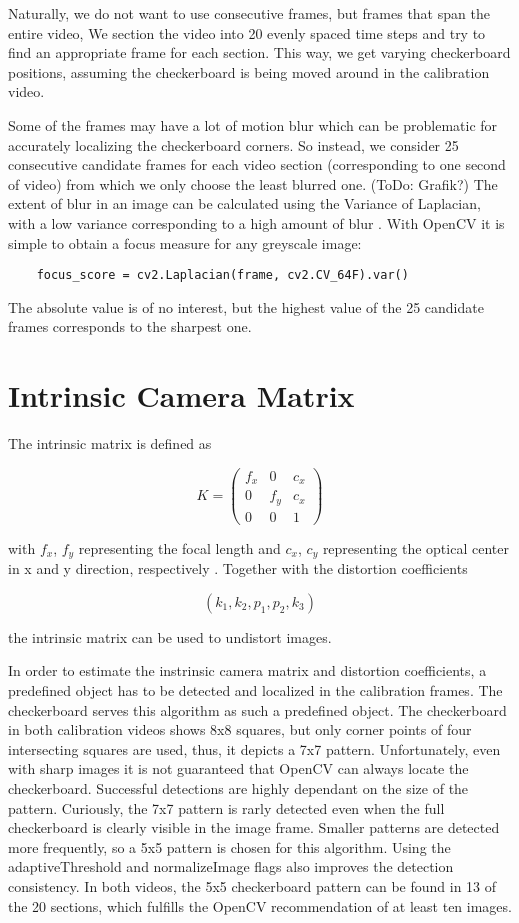 \documentclass[bibliography=totoc]{scrartcl}
\begin{document}
Naturally, we do not want to use consecutive frames, but frames that span the entire video,  
We section the video into 20 evenly spaced time steps and try to find an appropriate frame for each section.
This way, we get varying checkerboard positions, assuming the checkerboard is being moved around in the calibration video.

Some of the frames may have a lot of motion blur which can be problematic for accurately localizing the checkerboard corners.
So instead, we consider 25 consecutive candidate frames for each video section (corresponding to one second of video) from which we only choose the least blurred one. (ToDo: Grafik?)
The extent of blur in an image can be calculated using the Variance of Laplacian, with a low variance corresponding to a high amount of blur \cite{BlurDetection}.
With OpenCV it is simple to obtain a focus measure for any greyscale image:

\begin{lstlisting}
    focus_score = cv2.Laplacian(frame, cv2.CV_64F).var()
\end{lstlisting}

The absolute value is of no interest, but the highest value of the 25 candidate frames corresponds to the sharpest one.


\section{Intrinsic Camera Matrix}
The intrinsic matrix is defined as

$$
K =
\begin{pmatrix}
    f_x & 0 & c_x \\
    0 & f_y & c_x \\
    0 & 0 & 1
\end{pmatrix}
$$

with $f_x$, $f_y$ representing the focal length and $c_x$, $c_y$ representing the optical center in x and y direction, respectively \cite{CameraCalibration}.
Together with the distortion coefficients 

$$(k_1, k_2, p_1, p_2, k_3)$$

the intrinsic matrix can be used to undistort images.

In order to estimate the instrinsic camera matrix and distortion coefficients, a predefined object has to be detected and localized in the calibration frames.
The checkerboard serves this algorithm as such a predefined object.
The checkerboard in both calibration videos shows 8x8 squares, but only corner points of four intersecting squares are used, 
thus, it depicts a 7x7 pattern.
Unfortunately, even with sharp images it is not guaranteed that OpenCV can always locate the checkerboard.
Successful detections are highly dependant on the size of the pattern. 
Curiously, the 7x7 pattern is rarly detected even when the full checkerboard is clearly visible in the image frame.
Smaller patterns are detected more frequently, so a 5x5 pattern is chosen for this algorithm.
Using the adaptiveThreshold and normalizeImage flags also improves the detection consistency.
In both videos, the 5x5 checkerboard pattern can be found in 13 of the 20 sections, which fulfills the OpenCV recommendation of at least ten images.
\end{document}

